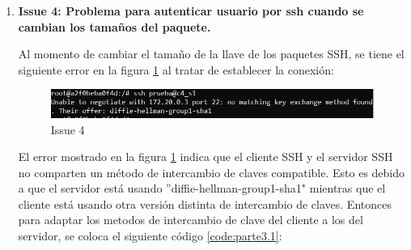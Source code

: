 \documentclass[letter,12pt]{article}
\newcounter{codecount}
\begin{document}
\begin{enumerate}
Este error aparece cuando una versión de ubuntu llegó al final de su vida útil por lo que ya no recibe actualizaciones compatibles. Es por ello que dentro de los foros de soporte de ubuntu \href{https://help.ubuntu.com/community/EOLUpgrades}{en este enlace,} muestran una forma de solucionarlo creando un archivo llamado source.list que contiene lo que se muestra a continuación en el código \ref{code:issue3}

\label{code:issue3}
\begin{lstlisting}[language=Dockerfile, caption={Solución al issue 3}]
## EOL upgrade sources.list
# Required
deb http://old-releases.ubuntu.com/ubuntu/ CODENAME main restricted universe multiverse
deb http://old-releases.ubuntu.com/ubuntu/ CODENAME-updates main restricted universe multiverse
deb http://old-releases.ubuntu.com/ubuntu/ CODENAME-security main restricted universe multiverse
\end{lstlisting}

En donde ''CODENAME" corresponde al nombre de la versión de ubuntu que se está usando. Luego, se debe añadir el siguiente código \ref{code:issue3.1} dentro del dockerfile.


\label{code:issue3.1}
\begin{lstlisting}[language=Dockerfile, caption={Solución al issue 3 en el dockerfile}]
COPY sources.list /etc/apt/
\end{lstlisting}

Luego, se debe hacer esto para cada versión de ubuntu que se quiere instalar.

\clearpage

    \item \textbf{Issue 4: Problema para autenticar usuario por ssh cuando se cambian los tamaños del paquete. }

Al momento de cambiar el tamaño de la llave de los paquetes SSH, se tiene el siguiente error en la figura \ref{fig:issue4} al tratar de establecer la conexión:

\begin{figure}[ht]
    \centering
    \includegraphics[width=1\linewidth]{Images/issues/issue4.png}
    \caption{Issue 4}
    \label{fig:issue4}
\end{figure}

El error mostrado en la figura \ref{fig:issue4} indica que el cliente SSH y el servidor SSH no comparten un método de intercambio de claves compatible. Esto es debido a que el servidor está usando ''diffie-hellman-group1-sha1" mientras que el cliente está usando otra versión distinta de intercambio de claves. Entonces para adaptar los metodos de intercambio de clave del cliente a los del servidor, se coloca el siguiente código \ref{code:parte3.1}:


\end{enumerate}
\end{document}

